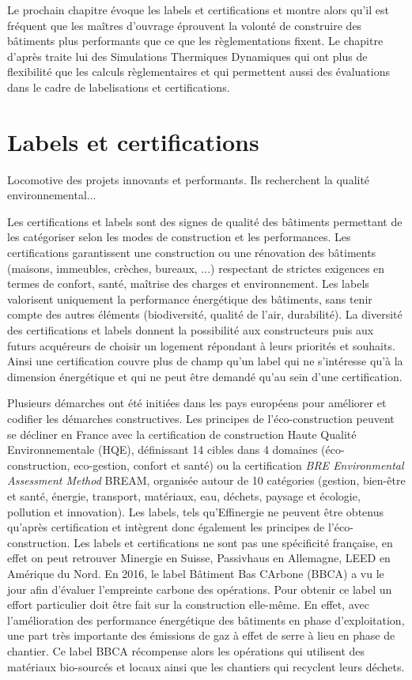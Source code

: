 Le prochain chapitre évoque les labels et certifications et montre alors qu'il est fréquent que les maîtres d'ouvrage éprouvent la volonté de construire des bâtiments plus performants que ce que les règlementations fixent. Le chapitre d'après traite lui des Simulations Thermiques Dynamiques qui ont plus de flexibilité que les calculs règlementaires et qui permettent aussi des évaluations dans le cadre de labelisations et certifications.

\section{Labels et certifications}

Locomotive des projets innovants et performants. Ils recherchent la qualité environnemental...

Les certifications et labels sont des signes de qualité des bâtiments permettant de les catégoriser selon les modes de construction et les performances. Les certifications garantissent une construction ou une rénovation des bâtiments (maisons, immeubles, crèches, bureaux, ...) respectant de strictes exigences en termes de confort, santé, maîtrise des charges et environnement. Les labels valorisent uniquement la performance énergétique des bâtiments, sans tenir compte des autres éléments (biodiversité, qualité de l'air, durabilité). La diversité des certifications et labels donnent la possibilité aux constructeurs puis aux futurs acquéreurs de choisir un logement répondant à leurs priorités et souhaits. Ainsi une certification couvre plus de champ qu'un label qui ne s'intéresse qu'à la dimension énergétique et qui ne peut être demandé qu'au sein d'une certification.

Plusieurs démarches ont été initiées dans les pays européens pour améliorer et codifier les démarches constructives. Les principes de l'éco-construction peuvent se décliner en France avec la certification de construction Haute Qualité Environnementale (HQE), définissant 14 cibles dans 4 domaines (éco-construction, eco-gestion, confort et santé) ou la certification \textit{BRE Environmental Assessment Method} BREAM, organisée autour de 10 catégories (gestion, bien-être et santé, énergie, transport, matériaux, eau, déchets, paysage et écologie, pollution et innovation). Les labels, tels qu'Effinergie ne peuvent être obtenus qu'après certification et intègrent donc également les principes de l'éco-construction. Les labels et certifications ne sont pas une spécificité française, en effet on peut retrouver Minergie en Suisse, Passivhaus en Allemagne, LEED en Amérique du Nord. En 2016, le label Bâtiment Bas CArbone (BBCA) a vu le jour afin d'évaluer l'empreinte carbone des opérations. Pour obtenir ce label un effort particulier doit être fait sur la construction elle-même. En effet, avec l'amélioration des performance énergétique des bâtiments en phase d'exploitation, une part très importante des émissions de gaz à effet de serre à lieu en phase de chantier. Ce label BBCA récompense alors les opérations qui utilisent des matériaux bio-sourcés et locaux ainsi que les chantiers qui recyclent leurs déchets.


